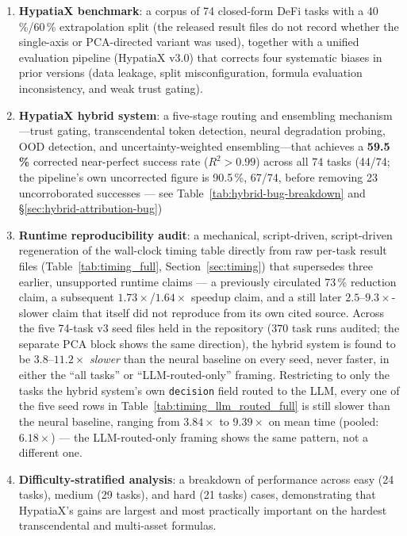 \documentclass[twoside,11pt]{article}
\newcommand{\Rsq}{R^{2}}
\begin{document}
\begin{enumerate}[leftmargin=2em,label=(\roman*)]
  \item \textbf{HypatiaX benchmark}: a corpus of 74 closed-form DeFi tasks
    with a 40\,\%/60\,\% extrapolation split (the released result files do not record whether the single-axis or PCA-directed variant was used), together
    with a unified evaluation pipeline (HypatiaX v3.0) that corrects four
    systematic biases in prior versions (data leakage, split misconfiguration,
    formula evaluation inconsistency, and weak trust gating).

  \item \textbf{HypatiaX hybrid system}: a five-stage routing and ensembling
    mechanism---trust gating, transcendental token detection, neural degradation
    probing, OOD detection, and uncertainty-weighted ensembling---that achieves
    a \textbf{59.5\,\%} corrected near-perfect success rate ($\Rsq>0.99$) across
    all 74 tasks (44/74; the pipeline's own uncorrected figure is 90.5\,\%, 67/74,
    before removing 23 uncorroborated successes --- see Table~\ref{tab:hybrid-bug-breakdown}
    and \S\ref{sec:hybrid-attribution-bug})

  \item \textbf{Runtime reproducibility audit}: a mechanical, script-driven,
    script-driven regeneration of the wall-clock timing table
    directly from raw per-task result files (Table~\ref{tab:timing_full},
    Section~\ref{sec:timing}) that supersedes three earlier, unsupported
    runtime claims --- a previously circulated 73\,\% reduction claim, a
    subsequent $1.73\times$/$1.64\times$ speedup claim, and a still later
    $2.5$--$9.3\times$-slower claim that itself did not reproduce from its
    own cited source. Across the five 74-task v3 seed files held in the
    repository ($370$ task runs audited; the separate PCA block shows the same
    direction), the hybrid
    system is found to be $3.8$--$11.2\times$ \emph{slower} than the neural
    baseline on every seed, never faster, in either the
    ``all tasks'' or ``LLM-routed-only'' framing. Restricting to only the
    tasks the hybrid system's own \texttt{decision} field routed to the LLM,
    every one of the five seed rows in Table~\ref{tab:timing_llm_routed_full}
    is still slower than the neural baseline, ranging from $3.84\times$ to
    $9.39\times$ on mean time (pooled: $6.18\times$)
    --- the LLM-routed-only framing shows the same pattern, not a different one.

  \item \textbf{Difficulty-stratified analysis}: a breakdown of performance across
    easy (24 tasks), medium (29 tasks), and hard (21 tasks) cases, demonstrating
    that HypatiaX's gains are largest and most practically important on the hardest
    transcendental and multi-asset formulas.
\end{enumerate}
\end{document}
